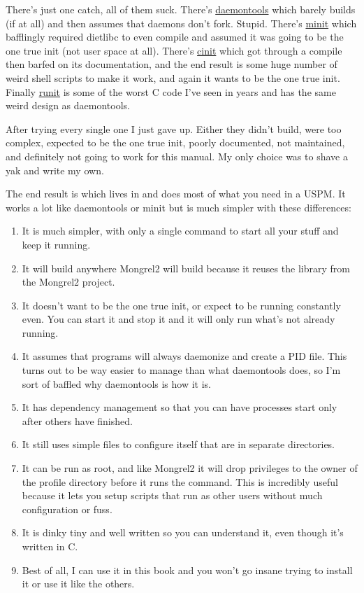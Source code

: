 There's just one catch, all of them suck.  There's \href{http://cr.yp.to/daemontools.html}{daemontools}
which barely builds (if at all) and then assumes that daemons don't fork.  Stupid.  There's 
\href{http://www.fefe.de/minit/}{minit} which bafflingly required dietlibc to even compile
and assumed it was going to be the one true init (not user space at all).  There's 
\href{http://www.nico.schottelius.org/software/cinit/}{cinit} which got through a compile
then barfed on its documentation, and the end result is some huge number of weird 
shell scripts to make it work, and again it wants to be the one true init.  Finally 
\href{http://smarden.org/runit/}{runit} is some of the worst C code I've seen in years and
has the same weird design as daemontools.

After trying every single one I just gave up.  Either they didn't build, were too complex,
expected to be the one true init, poorly documented, not maintained, and definitely not
going to work for this manual.  My only choice was to shave a yak and write my own.

The end result is  which lives in  and does
most of what you need in a USPM.  It works a lot like daemontools or minit but
is much simpler with these differences:

\begin{enumerate}
\item It is much simpler, with only a single command to start all your stuff and
    keep it running.
\item It will build anywhere Mongrel2 will build because it reuses the 
    library from the Mongrel2 project.
\item It doesn't want to be the one true init, or expect to be running constantly even.
    You can start it and stop it and it will only run what's not already running.
\item It assumes that programs will always daemonize and create a PID file.  This turns
    out to be way easier to manage than what daemontools does, so I'm sort of baffled why
    daemontools is how it is.
\item It has dependency management so that you can have processes start only after others
    have finished.
\item It still uses simple files to configure itself that are in separate directories.
\item It can be run as root, and like Mongrel2 it will drop privileges to the owner 
    of the profile directory before it runs the command.  This is incredibly useful because
    it lets you setup scripts that run as other users without much configuration or fuss.
\item It is dinky tiny and well written so you can understand it, even though it's written
    in C.
\item Best of all, I can use it in this book and you won't go insane trying to install it
    or use it like the others.
\end{enumerate}

